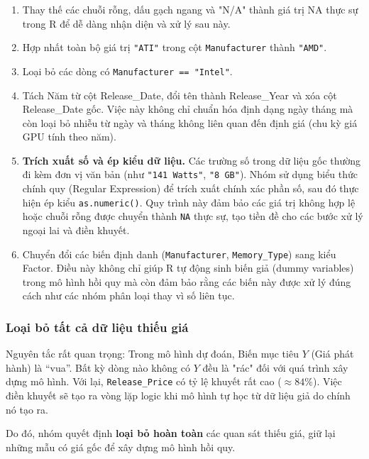 \begin{enumerate}
  \item Thay thế các chuỗi rỗng, dấu gạch ngang và "N/A" thành giá trị NA thực sự trong R để dễ dàng nhận diện và xử lý sau này.

  \item Hợp nhất toàn bộ giá trị \texttt{"ATI"} trong cột \texttt{Manufacturer} thành \texttt{"AMD"}.

  \item Loại bỏ các dòng có \texttt{Manufacturer == "Intel"}.
  
  \item Tách Năm từ cột Release\_Date, đổi tên thành Release\_Year và xóa cột Release\_Date gốc. Việc này không chỉ chuẩn hóa định dạng ngày tháng mà còn loại bỏ nhiễu từ ngày và tháng không liên quan đến định giá (chu kỳ giá GPU tính theo năm).

  \item \textbf{Trích xuất số và ép kiểu dữ liệu.} Các trường số trong dữ liệu gốc thường đi kèm đơn vị văn bản (như \texttt{"141 Watts"}, \texttt{"8 GB"}). Nhóm sử dụng biểu thức chính quy (Regular Expression) để trích xuất chính xác phần số, sau đó thực hiện ép kiểu \texttt{as.numeric()}. Quy trình này đảm bảo các giá trị không hợp lệ hoặc chuỗi rỗng được chuyển thành \texttt{NA} thực sự, tạo tiền đề cho các bước xử lý ngoại lai và điền khuyết.

  \item Chuyển đổi các biến định danh (\texttt{Manufacturer}, \texttt{Memory\_Type}) sang kiểu Factor. Điều này không chỉ giúp R tự động sinh biến giả (dummy variables) trong mô hình hồi quy mà còn đảm bảo rằng các biến này được xử lý đúng cách như các nhóm phân loại thay vì số liên tục.
\end{enumerate}

\subsubsection{Loại bỏ tất cả dữ liệu thiếu giá}

Nguyên tắc rất quan trọng: Trong mô hình dự đoán, Biến mục tiêu $Y$ (Giá phát hành) là ``vua''. Bất kỳ dòng nào không có $Y$ đều là "rác" đối với quá trình xây dựng mô hình. 
Với lại, \texttt{Release\_Price} có tỷ lệ khuyết rất cao ($\approx 84\%$). Việc điền khuyết sẽ tạo ra vòng lặp logic khi mô hình tự học từ dữ liệu giả do chính nó tạo ra. 

Do đó, nhóm quyết định \textbf{loại bỏ hoàn toàn} các quan sát thiếu giá, giữ lại những mẫu có giá gốc để xây dựng mô hình hồi quy.
